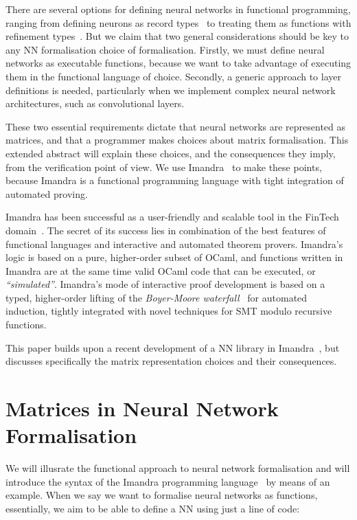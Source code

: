 \documentclass[runningheads]{llncs}
\begin{document}
There are several options for defining neural networks in functional programming, ranging from
defining neurons as record types~\cite{MariaBLFGRG22} to treating them as
functions with refinement types~\cite{KokkeKKAA20}. But we claim that two general considerations
should be key to any NN formalisation choice of formalisation. Firstly, we must define neural networks
as executable functions, because we want to take advantage of executing  them   in
the functional language of choice. Secondly, a generic approach
to layer definitions is needed, particularly when we implement complex neural network architectures, such as convolutional layers.

These two essential requirements dictate that neural networks are represented as matrices, and that a programmer makes choices about matrix formalisation.
This extended abstract will explain these choices, and the consequences they imply, from the verification point of view.
We use Imandra~\cite{PassmoreCIABKKM20} to make these points, because Imandra is a functional programming language with tight integration of automated proving.

Imandra has been
successful as a user-friendly and scalable tool in the FinTech
domain~\cite{Passmore21}. The secret of its success lies in combination of the
best features of functional languages and interactive and automated theorem
provers. Imandra's logic is based on a pure, higher-order subset of OCaml, and
functions written in Imandra are at the same time valid OCaml code that can be
executed, or \emph{``simulated''}. Imandra's mode of interactive proof
development is based on a typed, higher-order lifting of the \emph{Boyer-Moore
waterfall}~\cite{BM79} for automated induction, tightly integrated with novel
techniques for SMT modulo recursive functions.

This paper builds upon a recent development of a NN library in Imandra~\cite{DPKD22}, but
discusses specifically the matrix representation choices and their consequences.  


\section{Matrices in Neural Network Formalisation}
We will illusrate the functional approach to neural network formalisation and will introduce the syntax of the Imandra programming language~\cite{PassmoreCIABKKM20} by means of an example.
When we say we want to formalise neural networks as functions,
essentially, we aim to be able to define a NN using just a line of code:
\end{document}
